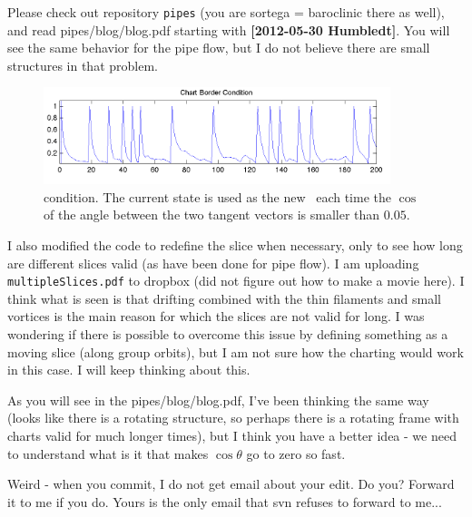 \begin{description}
Please check out repository \texttt{pipes} (you are sortega = baroclinic
there as well), and read pipes/blog/blog.pdf starting with {\bf
[2012-05-30 Humbledt]}. You will see the same behavior for the pipe flow,
but I do not believe there are small structures in that problem.


\begin{figure}
  \includegraphics[width=0.9\textwidth]{ChartBorder2}
  \caption{{\ChartBord} condition. The current state is used as the new
  \template\ each time the $\cos$ of the angle between the two
  tangent vectors  is smaller than
  $0.05$.}\label{ChartBorder2}
\end{figure}


\item[2012-07-19 Sebastian]
I also modified the code to redefine the slice when necessary, only to
see how long are different slices valid (as have been done for pipe
flow). I am uploading \texttt{multipleSlices.pdf} to dropbox (did not
figure out how to make a movie here). I think what is seen is that
drifting combined with the thin filaments and small vortices is the main
reason for which the slices are not valid for long. I was wondering if
there is possible to overcome this issue by defining something as a
moving slice (along group orbits), but I am not sure how the charting
would work in this case. I will keep thinking about this.

\item[2012-07-19 Predrag] As you will see in the pipes/blog/blog.pdf, I've
been thinking the same way (looks like there is a rotating structure, so
perhaps there is a rotating frame with charts valid for much longer times),
but I think you have a better idea - we need to understand what is it that
makes $\cos \theta$ go to zero so fast.

\item[2012-07-19 Predrag]  Weird - when you commit, I do not get email
about your edit. Do you? Forward it to me if you do. Yours is the only
email that svn refuses to forward to me...


\end{description}

